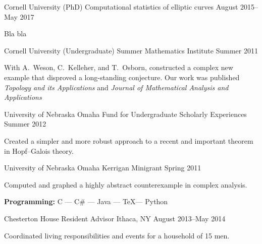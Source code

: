 \documentclass[11pt, letterpaper]{awesome-cv}
\begin{document}
\begin{cventries}

\cventry
	{Cornell University (PhD)}
	{Computational statistics of elliptic curves}
	{}
	{August 2015--May 2017}
	{
		\begin{cvitems}
			\item{Bla bla}
		\end{cvitems}
	}
	
\cventry
	{Cornell University (Undergraduate)}
	{Summer Mathematics Institute}
	{}
	{Summer 2011}
	{
		\begin{cvitems}
			\item{With A.~Weson, C.~Kelleher, and T.~Osborn, constructed a complex new example that disproved a long-standing conjecture. Our work was published \emph{Topology and its Applications} and \emph{Journal of Mathematical Analysis and Applications}}
		\end{cvitems}
	}

\cventry
	{University of Nebraska Omaha}
	{Fund for Undergraduate Scholarly Experiences}
	{}
	{Summer 2012}
	{
		\begin{cvitems}
			\item{Created a simpler and more robust approach to a recent and important theorem in Hopf--Galois theory.}
		\end{cvitems}
	}
	
\cventry
	{University of Nebraska Omaha}
	{Kerrigan Minigrant}
	{}
	{Spring 2011}
	{
		\begin{cvitems}
			\item{Computed and graphed a highly abstract counterexample in complex analysis.}
		\end{cvitems}
	}
	
\end{cventries}





\begin{cvparagraph}

\textbf{Programming:} C --- C\# --- Java --- \TeX --- Python
\end{cvparagraph}

\begin{cventries}

\cventry
	{Chesterton House}
	{Resident Advisor}
	{Ithaca, NY}
	{August 2013--May 2014}
	{
		\begin{cvitems}
			\item{Coordinated living responsibilities and events for a household of 15 men.}
		\end{cvitems}
	}
	
\end{cventries}
\end{document}
